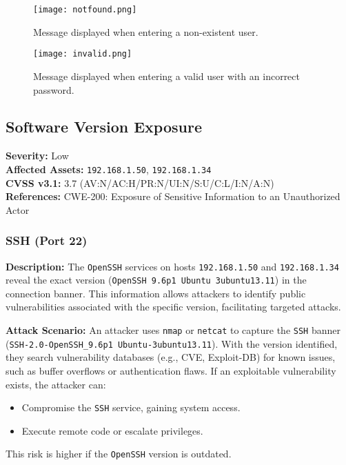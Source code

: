 \documentclass[a4paper,12pt]{article}
\begin{document}
\begin{figure}[H]
    \centering
    \texttt{[image: notfound.png]}
    \caption{Message displayed when entering a non-existent user.}
\end{figure}

\begin{figure}[H]
    \centering
    \texttt{[image: invalid.png]}
    \caption{Message displayed when entering a valid user with an incorrect password.}
\end{figure}

\clearpage

\subsection{Software Version Exposure}
\textbf{Severity:} \textcolor{NavyBlue}{Low} \\
\textbf{Affected Assets:} \texttt{192.168.1.50}, \texttt{192.168.1.34} \\
\textbf{CVSS v3.1:} 3.7 (AV:N/AC:H/PR:N/UI:N/S:U/C:L/I:N/A:N) \\
\textbf{References:} CWE-200: Exposure of Sensitive Information to an Unauthorized Actor

\subsubsection{SSH (Port 22)}
\textbf{Description:}  
The \texttt{OpenSSH} services on hosts \texttt{192.168.1.50} and \texttt{192.168.1.34} reveal the exact version (\texttt{OpenSSH 9.6p1 Ubuntu 3ubuntu13.11}) in the connection banner. This information allows attackers to identify public vulnerabilities associated with the specific version, facilitating targeted attacks.

\textbf{Attack Scenario:}  
An attacker uses \texttt{nmap} or \texttt{netcat} to capture the \texttt{SSH} banner (\texttt{SSH-2.0-OpenSSH\_9.6p1 Ubuntu-3ubuntu13.11}). With the version identified, they search vulnerability databases (e.g., CVE, Exploit-DB) for known issues, such as buffer overflows or authentication flaws. If an exploitable vulnerability exists, the attacker can:  
\begin{itemize}
    \item Compromise the \texttt{SSH} service, gaining system access.  
    \item Execute remote code or escalate privileges.  
\end{itemize}
This risk is higher if the \texttt{OpenSSH} version is outdated.
\end{document}
